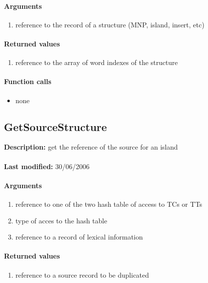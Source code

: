 \paragraph{Arguments}
\begin{enumerate}
\item reference to the record of a structure (MNP, island, insert, etc)
\end{enumerate}

\paragraph{Returned values}
\begin{enumerate}
\item reference to the array of word indexes of the structure
\end{enumerate}

\paragraph{Function calls}
\begin{itemize}
\item none
\end{itemize}

\subsection{GetSourceStructure}
\textbf{Description:} get the reference of the source for an island\\
\\\textbf{Last modified:} 30/06/2006

\paragraph{Arguments}
\begin{enumerate}
\item reference to one of the two hash table of access to TCs or TTs
\item type of acces to the hash table
\item reference to a record of lexical information
\end{enumerate}

\paragraph{Returned values}
\begin{enumerate}
\item reference to a source record to be duplicated
\end{enumerate}

